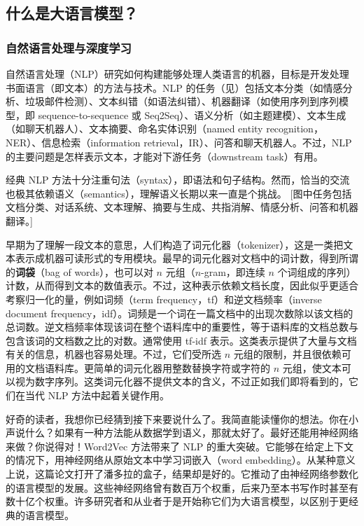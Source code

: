 \subsection{什么是大语言模型？}
\subsubsection{自然语言处理与深度学习}
自然语言处理（NLP）研究如何构建能够处理人类语言的机器，目标是开发处理书面语言（即文本）的方法与技术。NLP 的任务（见）包括文本分类（如情感分析、垃圾邮件检测）、文本纠错（如语法纠错）、机器翻译（如使用序列到序列模型，即 sequence-to-sequence 或 Seq2Seq）、语义分析（如主题建模）、文本生成（如聊天机器人）、文本摘要、命名实体识别（named entity recognition，NER）、信息检索（information retrieval，IR）、问答和聊天机器人。不过，NLP 的主要问题是怎样表示文本，才能对下游任务（downstream task）有用。

经典 NLP 方法十分注重句法（syntax），即语法和句子结构。然而，恰当的交流也极其依赖语义（semantics），理解语义长期以来一直是个挑战。
[图中任务包括文档分类、对话系统、文本理解、摘要与生成、共指消解、情感分析、问答和机器翻译。]

早期为了理解一段文本的意思，人们构造了词元化器（tokenizer），这是一类把文本表示成机器可读形式的专用模块。最早的词元化器对文档中的词计数，得到所谓的\textbf{词袋}（bag of words），也可以对 $n$ 元组（$n$-gram，即连续 $n$ 个词组成的序列）计数，从而得到文本的数值表示。不过，这种表示依赖文档长度，因此似乎更适合考察归一化的量，例如词频（term frequency，tf）和逆文档频率（inverse document frequency，idf）。词频是一个词在一篇文档中的出现次数除以该文档的总词数。逆文档频率体现该词在整个语料库中的重要性，等于语料库的文档总数与包含该词的文档数之比的对数。通常使用 tf-idf 表示。这类表示提供了大量与文档有关的信息，机器也容易处理。不过，它们受所选 $n$ 元组的限制，并且很依赖可用的文档语料库。更简单的词元化器用整数替换字符或字符的 $n$ 元组，使文本可以视为数字序列。这类词元化器不提供文本的含义，不过正如我们即将看到的，它们在当代 NLP 方法中起着关键作用。

好奇的读者，我想你已经猜到接下来要说什么了。我简直能读懂你的想法。你在小声说什么？如果有一种方法能从数据学到语义，那就太好了。最好还能用神经网络来做？你说得对！Word2Vec 方法带来了 NLP 的重大突破。它能够在给定上下文的情况下，用神经网络从原始文本中学习词嵌入（word embedding）。从某种意义上说，这篇论文打开了潘多拉的盒子，结果却是好的。它推动了由神经网络参数化的语言模型的发展。这些神经网络曾有数百万个权重，后来乃至本书写作时甚至有数十亿个权重。许多研究者和从业者于是开始称它们为大语言模型，以区别于更经典的语言模型。

